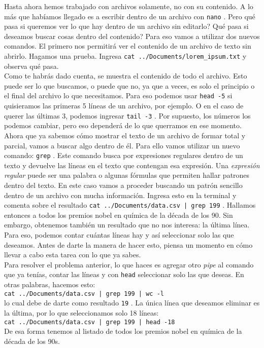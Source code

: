 \documentclass[10pt,letterpaper]{article}
\newcommand{\inlinecode}[1]{
\colorbox{light-gray}{\texttt{#1}}
}
\begin{document}
Hasta ahora hemos trabajado con archivos solamente, no con su contenido. A lo m\'as que hab\'iamos llegado es a escribir dentro de un archivo con \inlinecode{nano}. Pero qu\'e pasa si queremos ver lo que hay dentro de un archivo sin editarlo? Qu\'e pasa si deseamos buscar cosas dentro del contenido? Para eso vamos a utilizar dos nuevos comandos. El primero nos permitir\'a ver el contenido de un archivo de texto sin abrirlo. Hagamos una prueba. Ingresa \inlinecode{cat ../Documents/lorem\_ipsum.txt} y observa qu\'e pasa.\\

Como te habr\'as dado cuenta, se muestra el contenido de todo el archivo. Esto puede ser lo que buscamos, o puede que no, ya que a veces, es solo el principio o el final del archivo lo que necesitamos. Para eso podemos usar \inlinecode{head -5} si quisieramos las primeras 5 l\'ineas de un archivo, por ejemplo. O en el caso de querer las \'ultimas 3, podemos ingresar \inlinecode{tail -3}. Por supuesto, los n\'umeros los podemos cambiar, pero eso depender\'a de lo que querramos en ese momento.\\

Ahora que ya sabemos c\'omo mostrar el texto de un archivo de formar total y parcial, vamos a buscar algo dentro de \'el. Para ello vamos utilizar un nuevo comando: \inlinecode{grep}. Este comando busca por expresiones regulares dentro de un texto y devuelve las l\'ineas en el texto que contengan esa expresi\'on. Una \emph{expresi\'on regular} puede ser una palabra o algunas f\'ormulas que permiten hallar patrones dentro del texto. En este caso vamos a proceder buscando un patr\'on sencillo dentro de un archivo con mucha informaci\'on. Ingresa esto en la terminal y comenta sobre el resultado \inlinecode{cat ../Documents/data.csv | grep 199}. Hallamos entonces a todos los premios nobel en qu\'imica de la d\'ecada de los 90. Sin embargo, obtenemos tambi\'en un resultado que no nos interesa: la \'ultima l\'inea. Para eso, podemos contar cu\'antas l\'ineas hay y as\'i seleccionar solo las que deseamos. Antes de darte la manera de hacer esto, piensa un momento en c\'omo llevar a cabo esta tarea con lo que ya sabes.\\

Para resolver el problema anterior, lo que haces es agregar otro \emph{pipe} al comando que ya ten\'ias, contar las l\'ineas y con \inlinecode{head} seleccionar solo las que deseas. En otras palabras, hacemos esto:\\
\inlinecode{cat ../Documents/data.csv | grep 199 | wc -l}\\
lo cual debe de darte como resultado \inlinecode{19}. La \'unica l\'inea que deseamos eliminar es la \'ultima, por lo que seleccionamos solo 18 l\'ineas:\\
\inlinecode{cat ../Documents/data.csv | grep 199 | head -18}\\
De esa forma tenemos al listado de todos los premios nobel en qu\'imica de la d\'ecada de los 90s.
\end{document}
